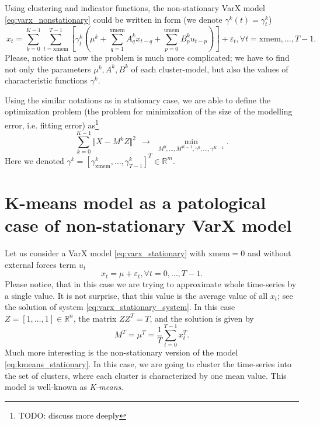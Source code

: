 \documentclass{article}
\newcommand{\todo}[1]{{\color{red}TODO: #1}} %
\begin{document}
 Using clustering and indicator functions, the non-stationary VarX model \eqref{eq:varx_nonstationary} could be written in form (we denote $\gamma^k(t) = \gamma^k_t$)
 \begin{equation}
  \label{eq:varx_nonstationary_gamma}
   \
	x_t = 
	\sum\limits_{k=0}^{K-1} 
	\sum\limits_{t=\mathrm{xmem}}^{T-1} 
	\left[
	 \gamma^k_t
	 \left( \mu^k + \sum\limits_{q=1}^{\mathrm{xmem}} A_q^k x_{t-q} + \sum\limits_{p=0}^{\mathrm{umem}} B_p^k u_{t-p} \right)
	\right] 
	+ \varepsilon_t, \forall t = \mathrm{xmem}, \dots, T-1.
 \end{equation}
 Please, notice that now the problem is much more complicated; we have to find not only the parameters $\mu^k, A^k,B^k$ of each cluster-model, but also the values of characteristic functions $\gamma^k$.

 Using the similar notations as in stationary case, we are able to define the optimization problem (the problem for minimization of the size of the modelling error, i.e. fitting error) as\footnote{\todo{discuss more deeply}} 
 \begin{displaymath}
  \label{eq:eq:varx_nonstationary_matrix_eps}
  \sum\limits_{k=0}^{K-1} \Vert X - M^k Z \Vert^2 ~~ \rightarrow ~~ \min\limits_{M^0,\dots,M^{K-1}, \gamma^{0}, \dots, \gamma^{K-1}}.
 \end{displaymath} 
 Here we denoted $\gamma^k = [\gamma^k_{\mathrm{xmem}}, \dots, \gamma^k_{T-1} ]^T \in \mathbb{R}^m$.
 
 \section {K-means model as a patological case of non-stationary VarX model}

 Let us consider a VarX model \eqref{eq:varx_stationary} with $\mathrm{xmem} = 0$ and without external forces term $u_t$
 \begin{equation}
  \label{eq:kmeans_stationary}
  x_t = \mu + \varepsilon_t, \forall t = 0,\dots,T-1.
 \end{equation}
 Please notice, that in this case we are trying to approximate whole time-series by a single value. It is not surprise, that this value is the average value of all $x_t$;
 see the solution of system \eqref{eq:varx_stationary_system}. In this case $Z = [1,\dots,1] \in \mathbb{R}^n$, the matrix $ZZ^T = T$, and the solution is given by
 \begin{displaymath}
  M^T = \mu^T = \frac{1}{T} \sum\limits_{t=0}^{T-1} x_t^T.
 \end{displaymath}
 Much more interesting is the non-stationary version of the model \eqref{eq:kmeans_stationary}. In this case, we are going to cluster the time-series into the set of clusters,
 where each cluster is characterized by one mean value. This model is well-known as \emph{K-means}.
\end{document}
